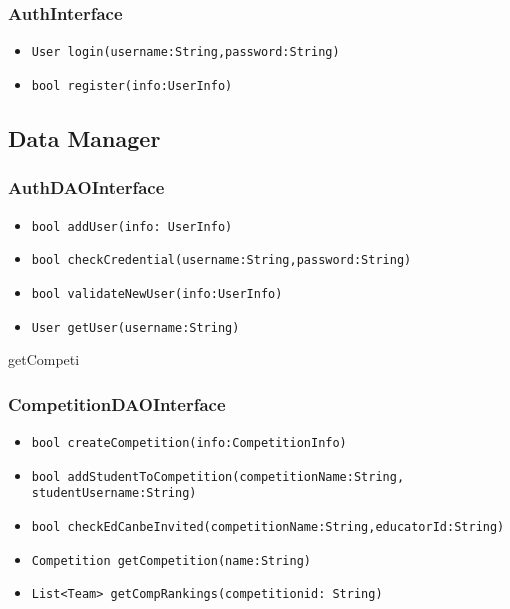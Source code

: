 \subsubsection{AuthInterface}
\begin{itemize}
    \item \texttt{User login(username:String,password:String)}%
    \item \texttt{bool register(info:UserInfo)} %
\end{itemize}

\subsection{Data Manager}
\subsubsection{AuthDAOInterface}
\begin{itemize}
    \item \texttt{bool addUser(info: UserInfo)}%
    \item \texttt{bool checkCredential(username:String,password:String)}%
    \item \texttt{bool validateNewUser(info:UserInfo)}%
    \item \texttt{User getUser(username:String)}%
\end{itemize}
getCompeti
\subsubsection{CompetitionDAOInterface}
\begin{itemize}
    \item \texttt{bool createCompetition(info:CompetitionInfo)}
    \item \texttt{bool addStudentToCompetition(competitionName:String, studentUsername:String)}
    \item \texttt{bool checkEdCanbeInvited(competitionName:String,educatorId:String)}%
    \item \texttt{Competition getCompetition(name:String)}%
    \item \texttt{List<Team> getCompRankings(competitionid: String)}
\end{itemize}

